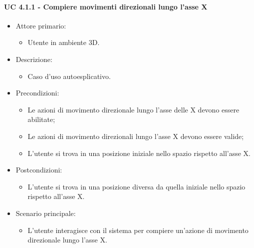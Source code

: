\paragraph{UC 4.1.1 - Compiere movimenti direzionali lungo l'asse X}
\begin{itemize}

	\item Attore primario: 
	\begin{itemize}
		\item Utente in ambiente 3D.
	\end{itemize}
	\item Descrizione:
	\begin{itemize}
		\item Caso d'uso autoesplicativo.
	\end{itemize}
	
	\item Precondizioni:
	\begin{itemize}
		\item Le azioni di movimento direzionale lungo l'asse delle X devono essere abilitate;
		\item Le azioni di movimento direzionali lungo l'asse X devono essere valide;
		\item L'utente si trova in una posizione iniziale nello spazio rispetto all'asse X.
	\end{itemize}
	
	\item Postcondizioni:
	\begin{itemize}
		\item L'utente si trova in una posizione diversa da quella iniziale nello spazio rispetto all'asse X.
	\end{itemize}
	
	\item Scenario principale:
	\begin{itemize}
		\item L'utente interagisce con il sistema per compiere un'azione di movimento direzionale lungo l'asse X.
	\end{itemize}
	
\end{itemize}

